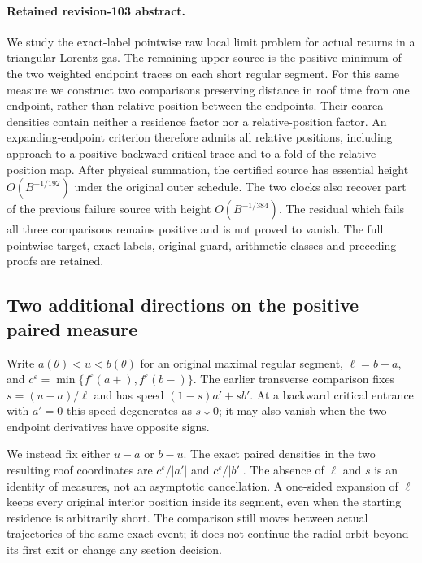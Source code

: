 \documentclass[11pt,reqno]{amsart}
\numberwithin{equation}{section}
\theoremstyle{definition}\newtheorem{definition}[theorem]{Definition}
\theoremstyle{remark}\newtheorem{remark}[theorem]{Remark}
\theoremstyle{definition}\newtheorem{inputstatement}[theorem]{Input statement}
\begin{document}
\paragraph{Retained revision-103 abstract.}

We study the exact-label pointwise raw local limit problem for actual
returns in a triangular Lorentz gas. The remaining upper source is
the positive minimum of the two weighted endpoint traces on each
short regular segment. For this same measure we construct two
comparisons preserving distance in roof time from one endpoint,
rather than relative position between the endpoints. Their coarea
densities contain neither a residence factor nor a relative-position
factor. An expanding-endpoint criterion therefore admits all relative
positions, including approach to a positive backward-critical trace
and to a fold of the relative-position map. After physical summation,
the certified source has essential height $O(B^{-1/192})$ under the
original outer schedule. The two clocks also recover part of the
previous failure source with height $O(B^{-1/384})$. The residual
which fails all three comparisons remains positive and is not proved
to vanish. The full pointwise target, exact labels, original guard,
arithmetic classes and preceding proofs are retained.




\subsection{Two additional directions on the positive paired measure}
Write $a(\theta)<u<b(\theta)$ for an original maximal regular
segment, $\ell=b-a$, and
$c^\varepsilon=\min\{f^\varepsilon(a+),f^\varepsilon(b-)\}$.
The earlier transverse comparison fixes $s=(u-a)/\ell$ and has
speed $(1-s)a'+sb'$. At a backward critical entrance with $a'=0$
this speed degenerates as $s\downarrow0$; it may also vanish when
the two endpoint derivatives have opposite signs.

We instead fix either $u-a$ or $b-u$. The exact paired densities
in the two resulting roof coordinates are $c^\varepsilon/|a'|$
and $c^\varepsilon/|b'|$. The absence of $\ell$ and $s$ is an
identity of measures, not an asymptotic cancellation. A one-sided
expansion of $\ell$ keeps every original interior position inside
its segment, even when the starting residence is arbitrarily short.
The comparison still moves between actual trajectories of the same
exact event; it does not continue the radial orbit beyond its first
exit or change any section decision.
\end{document}
